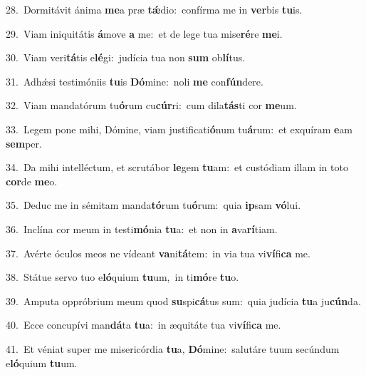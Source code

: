 {\numbfont\textcolor{\numbcolor}{28.}}~Dormitávit ánima \textbf{me}\-a præ \textbf{tǽ}\-dio:~\star confírma me in \textbf{ver}\-bis \textbf{tu}\-is.\par
{\numbfont\textcolor{\numbcolor}{29.}}~Viam iniquitátis \textbf{á}\-move \textbf{a} me:~\star et de lege tua mise\-\textbf{ré}\-re \textbf{me}\-i.\par
{\numbfont\textcolor{\numbcolor}{30.}}~Viam veri\-\textbf{tá}\-tis e\-\textbf{lé}\-gi:~\star judícia tua non \textbf{sum} ob\-\textbf{lí}\-tus.\par
{\numbfont\textcolor{\numbcolor}{31.}}~Adhǽsi testimóniis \textbf{tu}\-is \textbf{Dó}\-mine:~\star noli \textbf{me} con\-\textbf{fún}\-dere.\par
{\numbfont\textcolor{\numbcolor}{32.}}~Viam mandatórum tu\-\textbf{ó}\-rum cu\-\textbf{cúr}\-ri:~\star cum dila\-\textbf{tás}\-ti cor \textbf{me}\-um.\par
{\numbfont\textcolor{\numbcolor}{33.}}~Legem pone mihi, Dómine, viam justificati\-\textbf{ó}\-num tu\-\textbf{á}\-rum:~\star et exquíram \textbf{e}\-am \textbf{sem}\-per.\par
{\numbfont\textcolor{\numbcolor}{34.}}~Da mihi intelléctum, et scrutábor \textbf{le}\-gem \textbf{tu}\-am:~\star et custódiam illam in toto \textbf{cor}\-de \textbf{me}\-o.\par
{\numbfont\textcolor{\numbcolor}{35.}}~Deduc me in sémitam manda\-\textbf{tó}\-rum tu\-\textbf{ó}\-rum:~\star quia \textbf{ip}\-sam \textbf{vó}\-lui.\par
{\numbfont\textcolor{\numbcolor}{36.}}~Inclína cor meum in testi\-\textbf{mó}\-nia \textbf{tu}\-a:~\star et non in \textbf{a}\-va\-\textbf{rí}\-tiam.\par
{\numbfont\textcolor{\numbcolor}{37.}}~Avérte óculos meos ne vídeant \textbf{va}\-ni\-\textbf{tá}\-tem:~\star in via tua vi\-\textbf{ví}\-fi\textbf{ca} me.\par
{\numbfont\textcolor{\numbcolor}{38.}}~Státue servo tuo e\-\textbf{ló}\-quium \textbf{tu}\-um,~\star in ti\-\textbf{mó}\-re \textbf{tu}\-o.\par
{\numbfont\textcolor{\numbcolor}{39.}}~Amputa oppróbrium meum quod \textbf{su}\-spi\-\textbf{cá}\-tus sum:~\star quia judícia \textbf{tu}\-a ju\-\textbf{cún}\-da.\par
{\numbfont\textcolor{\numbcolor}{40.}}~Ecce concupívi man\-\textbf{dá}\-ta \textbf{tu}\-a:~\star in æquitáte tua vi\-\textbf{ví}\-fi\textbf{ca} me.\par
{\numbfont\textcolor{\numbcolor}{41.}}~Et véniat super me misericórdia \textbf{tu}\-a, \textbf{Dó}\-mine:~\star salutáre tuum secúndum e\-\textbf{ló}\-quium \textbf{tu}\-um.\par

